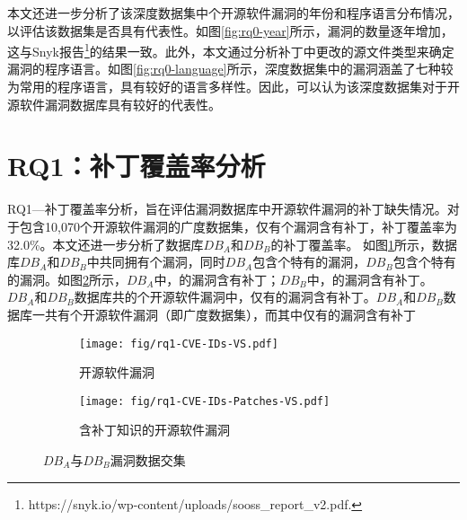    

本文还进一步分析了该深度数据集中个开源软件漏洞的年份和程序语言分布情况，以评估该数据集是否具有代表性。如图\ref{fig:rq0-year}所示，漏洞的数量逐年增加，这与Snyk报告\footnote{https://snyk.io/wp-content/uploads/sooss\_report\_v2.pdf.}的结果一致。此外，本文通过分析补丁中更改的源文件类型来确定漏洞的程序语言。如图\ref{fig:rq0-language}所示，深度数据集中的漏洞涵盖了七种较为常用的程序语言，具有较好的语言多样性。因此，可以认为该深度数据集对于开源软件漏洞数据库具有较好的代表性。


\section{RQ1：补丁覆盖率分析}\label{sec:coverage}
RQ1---补丁覆盖率分析，旨在评估漏洞数据库中开源软件漏洞的补丁缺失情况。对于包含10,070个开源软件漏洞的广度数据集，仅有个漏洞含有补丁，补丁覆盖率为32.0\%。本文还进一步分析了数据库$DB_A$和$DB_B$的补丁覆盖率。
如图\ref{fig:rq1-cves}所示，数据库$DB_A$和$DB_B$中共同拥有个漏洞，同时$DB_A$包含个特有的漏洞，$DB_B$包含个特有的漏洞。如图\ref{fig:rq1-cves-with-patches}所示，$DB_A$中，的漏洞含有补丁；$DB_B$中，的漏洞含有补丁。$DB_A$和$DB_B$数据库共的个开源软件漏洞中，仅有的漏洞含有补丁。$DB_A$和$DB_B$数据库一共有个开源软件漏洞（即广度数据集），而其中仅有的漏洞含有补丁
\begin{figure}[!t]
    \centering
    \begin{subfigure}[b]{0.45\textwidth}
    \centering
    \texttt{[image: fig/rq1-CVE-IDs-VS.pdf]}
    \caption{开源软件漏洞}\label{fig:rq1-cves}
    \end{subfigure}
    \begin{subfigure}[b]{0.45\textwidth}
    \centering
    \texttt{[image: fig/rq1-CVE-IDs-Patches-VS.pdf]}
    \caption{含补丁知识的开源软件漏洞}\label{fig:rq1-cves-with-patches}
    \end{subfigure}
    \caption{$DB_A$与$DB_B$漏洞数据交集}\label{fig:intersection}
\end{figure}

